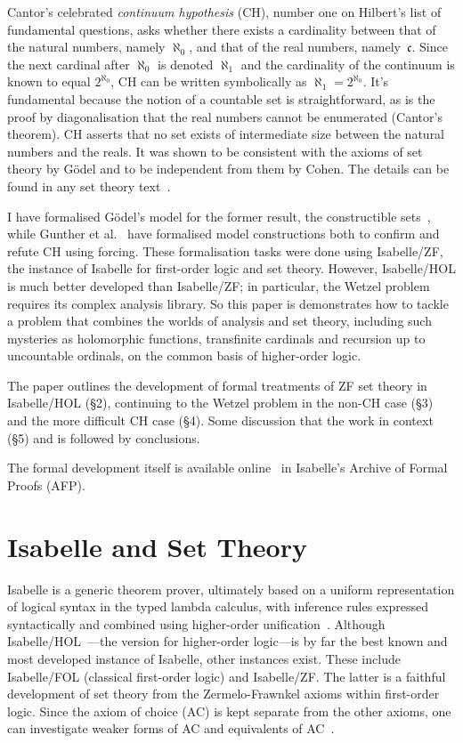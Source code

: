 \documentclass[runningheads]{llncs}
\begin{document}
Cantor's celebrated \textit{continuum hypothesis} (CH), number one on Hilbert's list of fundamental questions, asks whether there exists a cardinality between that of the natural numbers, namely $\aleph_0$, and that of the real numbers, namely~$\mathfrak{c}$.
Since the next cardinal after $\aleph_0$ is denoted $\aleph_1$ and the cardinality of the continuum is known to equal $2^{\aleph_0}$,  CH can be written symbolically as $\aleph_1 = 2^{\aleph_0}$.
It's fundamental because the notion of a countable set is straightforward, as is the proof by diagonalisation that the real numbers cannot be enumerated (Cantor's theorem).
CH asserts that no set exists of intermediate size between the natural numbers and the reals.
It was shown to be consistent with the axioms of set theory by Gödel and to be independent from them by Cohen.
The details can be found in any set theory text~\cite{kunen80}.

I have formalised Gödel's model for the former result, the constructible sets~\cite{paulson-consistency}, while
Gunther et al.\ \cite{Independence_CH-AFP} have formalised model constructions both to confirm and refute CH using forcing.
These formalisation tasks were done using Isabelle/ZF, the instance of Isabelle for first-order logic and set theory.
However, Isabelle/HOL is much better developed than Isabelle/ZF;
in particular, the Wetzel problem requires its complex analysis library. So this paper is demonstrates how to tackle a problem that combines the worlds of analysis and set theory, including such mysteries as holomorphic functions, transfinite cardinals and recursion up to uncountable ordinals, on the common basis of higher-order logic.

The paper outlines the development of formal treatments of ZF set theory in Isabelle/HOL (\S2), continuing to the Wetzel problem in the non-CH case (\S3) and the more difficult CH case (\S4). Some discussion that the work in context (\S5) and is followed by conclusions.

The formal development itself is available online~\cite{Wetzels_Problem-AFP} in Isabelle's Archive of Formal Proofs (AFP).

\section{Isabelle and Set Theory}

Isabelle is a generic theorem prover, ultimately based on a uniform representation of logical syntax in the typed lambda calculus, with inference rules expressed syntactically and combined using higher-order unification~\cite{paulson-found}. Although Isabelle/HOL~\cite{isa-tutorial}---the version for higher-order logic---is by far the best known and most developed instance of Isabelle, other instances exist. These include Isabelle/FOL (classical first-order logic) and Isabelle/ZF\@.
The latter is a faithful development of set theory from the Zermelo-Frawnkel axioms within first-order logic.
Since the axiom of choice (AC) is kept separate from the other axioms, one can investigate weaker forms of AC and equivalents of AC~\cite{paulson-gr}. 
\end{document}
